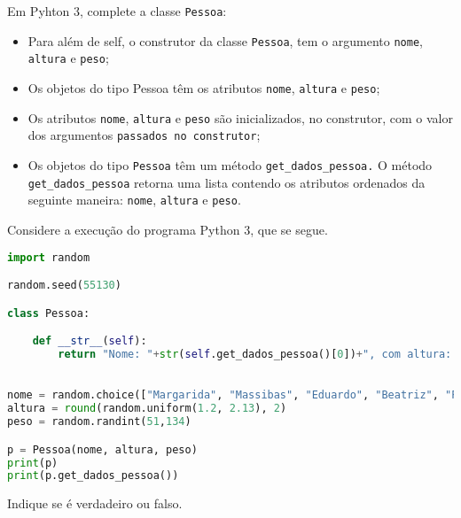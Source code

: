 \documentclass[12pt,varwidth=16cm,border=17pt]{standalone}
\begin{document}
Em Pyhton 3, complete a classe \verb+Pessoa+:

\begin{itemize}
  \item Para além de self, o construtor da classe \verb+Pessoa+, tem o argumento \verb+nome+, \verb+altura+ e \verb+peso+;
  \item Os objetos do tipo Pessoa têm os atributos \verb+nome+, \verb+altura+ e \verb+peso+;
  \item Os atributos \verb+nome+, \verb+altura+ e \verb+peso+ são inicializados, no construtor, com o valor
   dos argumentos \verb+passados no construtor+;
  \item Os objetos do tipo \verb+Pessoa+ têm um método \verb+get_dados_pessoa.+ 
  O método \verb+get_dados_pessoa+ retorna uma lista contendo os atributos ordenados da seguinte maneira: \verb+nome+, \verb+altura+ e \verb+peso+. 
\end{itemize}

Considere a execução do programa Python 3, que se segue. 

\begin{lstlisting}[language=Python]
import random

random.seed(55130)

class Pessoa:

	def __str__(self):
		return "Nome: "+str(self.get_dados_pessoa()[0])+", com altura: "+str(self.get_dados_pessoa()[1])+" e peso: "+str(self.get_dados_pessoa()[2])
		

nome = random.choice(["Margarida", "Massibas", "Eduardo", "Beatriz", "Pedro", "Diogo", "Miguel", "Rita", "Marta", "Leonor", "Fonseca", "Duarte", "Madorna"])
altura = round(random.uniform(1.2, 2.13), 2)
peso = random.randint(51,134)

p = Pessoa(nome, altura, peso)
print(p)
print(p.get_dados_pessoa())
\end{lstlisting}

Indique se é verdadeiro ou falso.
\end{document}
